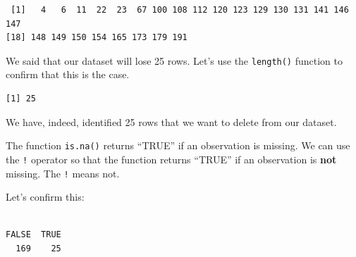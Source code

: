 \documentclass[]{book}
\newenvironment{Shaded}{\begin{snugshade}}{\end{snugshade}}
\newcommand{\KeywordTok}[1]{\textcolor[rgb]{0.13,0.29,0.53}{\textbf{#1}}}
\newcommand{\CommentTok}[1]{\textcolor[rgb]{0.56,0.35,0.01}{\textit{#1}}}
\newcommand{\OperatorTok}[1]{\textcolor[rgb]{0.81,0.36,0.00}{\textbf{#1}}}
\newcommand{\NormalTok}[1]{#1}
\theoremstyle{definition}
\theoremstyle{definition}
\theoremstyle{definition}
\theoremstyle{remark}
\begin{document}
\begin{Shaded}
\end{Shaded}

\begin{verbatim}
 [1]   4   6  11  22  23  67 100 108 112 120 123 129 130 131 141 146 147
[18] 148 149 150 154 165 173 179 191
\end{verbatim}

We said that our dataset will lose 25 rows. Let's use the
\texttt{length()} function to confirm that this is the case.

\begin{Shaded}
\end{Shaded}

\begin{verbatim}
[1] 25
\end{verbatim}

We have, indeed, identified 25 rows that we want to delete from our
dataset.

The function \texttt{is.na()} returns ``TRUE'' if an observation is
missing. We can use the \texttt{!} operator so that the function returns
``TRUE'' if an observation is \textbf{not} missing. The \texttt{!} means
not.

Let's confirm this:

\begin{Shaded}
\end{Shaded}

\begin{verbatim}

FALSE  TRUE 
  169    25 
\end{verbatim}

\begin{Shaded}
\end{Shaded}
\end{document}
